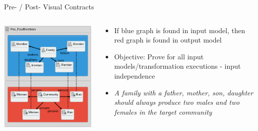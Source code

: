 \documentclass[12pt, handout]{beamer}
\begin{document}
\begin{frame}{Pre- / Post- Visual Contracts}
\begin{columns}[T] %
     \begin{column}[T]{0.45\textwidth} %
     \includegraphics[width=\textwidth]{figures/Pos_FourMembers}
     \end{column}
     \begin{column}[T]{0.55\textwidth}
     \begin{itemize}[<+->]
     \item If blue graph is found in input model, then red graph is found in output model
     \item Objective: Prove for all input models/transformation executions - input independence
     \item \textit{A family with a father, mother, son, daughter
     should always produce two males and two females in the
     target community}
     \end{itemize}
     \end{column}
     \end{columns}

\end{frame}
\end{document}
